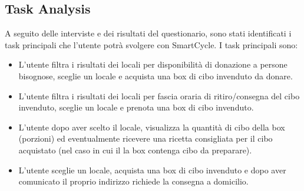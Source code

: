 \documentclass{article}
\begin{document}
\subsection{Task Analysis}
A seguito delle interviste e dei risultati del questionario, sono stati identificati i task principali che l'utente potrà svolgere con SmartCycle.
\newline
I task principali sono:
\begin{itemize}
    \item L'utente filtra i risultati dei locali per disponibilità di donazione a persone bisognose, sceglie un locale e acquista una box di cibo invenduto da donare.
    \item L'utente filtra i risultati dei locali per fascia oraria di ritiro/consegna del cibo invenduto, sceglie un locale e prenota una box di cibo invenduto.
    \item L'utente dopo aver scelto il locale, visualizza la quantità di cibo della box (porzioni) ed eventualmente ricevere una ricetta consigliata per il cibo acquistato (nel caso in cui il la box contenga cibo da preparare).
    \item L'utente sceglie un locale, acquista una box di cibo invenduto e dopo aver comunicato il proprio indirizzo richiede la consegna a domicilio.
\end{itemize}
\end{document}
